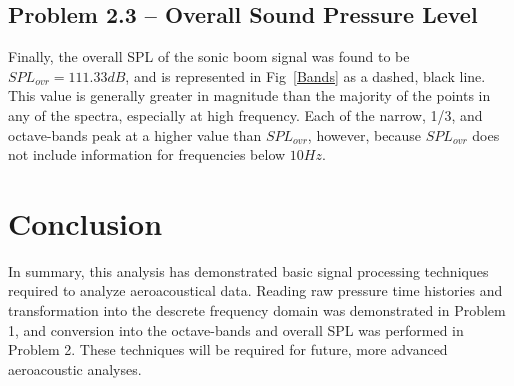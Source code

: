 \documentclass[twocolumn,10pt]{asme2ej}
\begin{document}
\subsection{Problem 2.3 -- Overall Sound Pressure Level}

Finally, the overall SPL of the sonic boom signal was found to be $\boxed{SPL_{ovr}=111.33dB}$, and is represented in Fig~\ref{Bands} as a dashed, black line.  This value is generally greater in magnitude than the majority of the points in any of the spectra, especially at high frequency.  Each of the narrow, 1/3, and octave-bands peak at a higher value than $SPL_{ovr}$, however, because $SPL_{ovr}$ does not include information for frequencies below $10Hz$.





\section{Conclusion}

In summary, this analysis has demonstrated basic signal processing techniques required to analyze aeroacoustical data.  Reading raw pressure time histories and transformation into the descrete frequency domain was demonstrated in Problem 1, and conversion into the octave-bands and overall SPL was performed in Problem 2.  These techniques will be required for future, more advanced aeroacoustic analyses.










\onecolumn      %
\appendix       %
\end{document}
